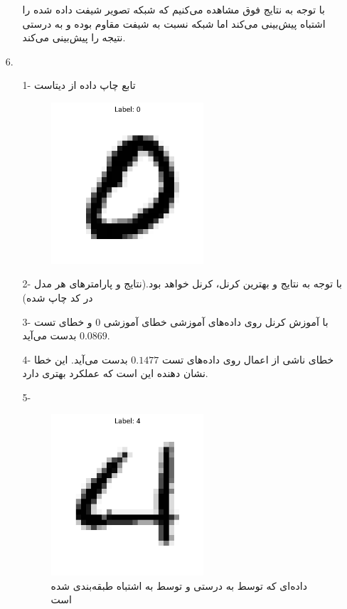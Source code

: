 \documentclass[a4paper]{article}
\begin{document}
\begin{itemize}
\begin{itemize}
با توجه به نتایج فوق مشاهده می‌کنیم که شبکه
	تصویر شیفت داده شده را اشتباه پیش‌بینی می‌کند اما شبکه
	نسبت به شیفت مقاوم بوده و به درستی نتیجه را پیش‌بینی می‌کند.
	\end{itemize}
	\newpage
	\item[6.]‌
	\begin{itemize}
		\item[1-] تابع چاپ داده از دیتاست
		\begin{figure}[!h]
		\begin{center}
			\includegraphics[height=6cm]{Pic5.png}
		\end{center}
		\end{figure}
		\item [2-]
		با توجه به نتایج 
		و 
		بهترین کرنل، کرنل
		خواهد بود.(نتایج و پارامترهای هر مدل در کد چاپ شده)
		\item [3-]
		با آموزش کرنل 
		روی داده‌های آموزشی خطای آموزشی $0$ و خطای تست $0.0869$ بدست می‌آید.
		\item [4-]
		خطای ناشی از اعمال 
		روی داده‌های تست $0.1477$
		بدست می‌آید. این خطا نشان دهنده این است که
		عملکرد بهتری دارد.
		\item[5-]
		‌
				\begin{figure}[!h]
			\begin{center}
				\includegraphics[height=6cm]{Pic7.png}
			\end{center}
			\caption{
				داده‌ای که توسط 
				به درستی و توسط 
				به اشتباه طبقه‌بندی شده است
			 }
		\end{figure}
	\end{itemize}
\end{itemize}
\end{document}
